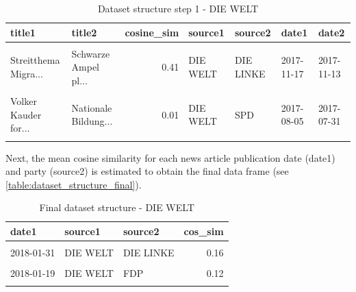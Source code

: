 \documentclass[
]{article}
\begin{document}
\begin{table}[H]

\caption{\label{tab:Dataset structure 1}Dataset structure step 1 - DIE WELT \label{table:dataset_structure1}}
\centering
\fontsize{7}{9}\selectfont
\begin{tabular}[t]{llrllll}
\toprule
title1 & title2 & cosine\_sim & source1 & source2 & date1 & date2\\
\midrule
\cellcolor{gray!6}{Unions-Fraktionsv...} & \cellcolor{gray!6}{Martin Hess: Fußf...} & \cellcolor{gray!6}{0.01} & \cellcolor{gray!6}{DIE WELT} & \cellcolor{gray!6}{AfD} & \cellcolor{gray!6}{2017-11-21} & \cellcolor{gray!6}{2017-11-17}\\
Streitthema Migra... & Schwarze Ampel pl... & 0.41 & DIE WELT & DIE LINKE & 2017-11-17 & 2017-11-13\\
\cellcolor{gray!6}{Jamaika-Koalition...} & \cellcolor{gray!6}{Unter Nazi-Vergan...} & \cellcolor{gray!6}{0.18} & \cellcolor{gray!6}{DIE WELT} & \cellcolor{gray!6}{B90/GRÜNE} & \cellcolor{gray!6}{2017-09-17} & \cellcolor{gray!6}{2017-09-15}\\
Volker Kauder for... & Nationale Bildung... & 0.01 & DIE WELT & SPD & 2017-08-05 & 2017-07-31\\
\cellcolor{gray!6}{Asylbewerber: Bun...} & \cellcolor{gray!6}{Groko forever? Di...} & \cellcolor{gray!6}{0.14} & \cellcolor{gray!6}{DIE WELT} & \cellcolor{gray!6}{DIE LINKE} & \cellcolor{gray!6}{2017-12-03} & \cellcolor{gray!6}{2017-11-30}\\
\bottomrule
\end{tabular}
\end{table}

Next, the mean cosine similarity for each news article publication date
(date1) and party (source2) is estimated to obtain the final data frame
(see \autoref{table:dataset_structure_final}).

\begin{table}[H]

\caption{\label{tab:Dataset structure final}Final dataset structure - DIE WELT \label{table:dataset_structure_final}}
\centering
\fontsize{7}{9}\selectfont
\begin{tabular}[t]{lllr}
\toprule
date1 & source1 & source2 & cos\_sim\\
\midrule
\cellcolor{gray!6}{2017-08-19} & \cellcolor{gray!6}{DIE WELT} & \cellcolor{gray!6}{FDP} & \cellcolor{gray!6}{0.19}\\
2018-01-31 & DIE WELT & DIE LINKE & 0.16\\
\cellcolor{gray!6}{2017-10-17} & \cellcolor{gray!6}{DIE WELT} & \cellcolor{gray!6}{CDU} & \cellcolor{gray!6}{0.15}\\
2018-01-19 & DIE WELT & FDP & 0.12\\
\cellcolor{gray!6}{2018-01-29} & \cellcolor{gray!6}{DIE WELT} & \cellcolor{gray!6}{B90/GRÜNE} & \cellcolor{gray!6}{0.18}\\
\bottomrule
\end{tabular}
\end{table}
\end{document}
